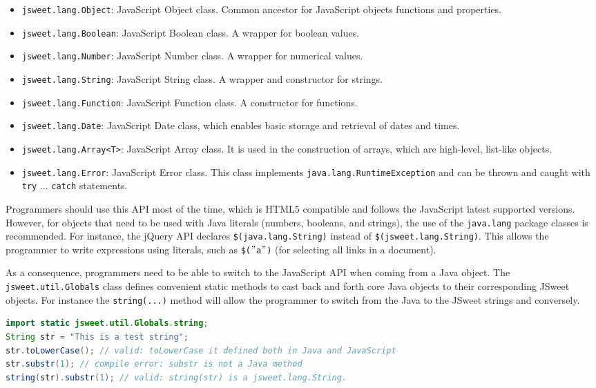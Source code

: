 \documentclass[a4paper]{report}
\begin{document}
\begin{itemize}
\item \texttt{jsweet.lang.Object}: JavaScript Object class. Common ancestor for JavaScript objects functions and properties.
\item \texttt{jsweet.lang.Boolean}: JavaScript Boolean class. A wrapper for boolean values.
\item \texttt{jsweet.lang.Number}: JavaScript Number class. A wrapper for numerical values.
\item \texttt{jsweet.lang.String}: JavaScript String class. A wrapper and constructor for strings.
\item \texttt{jsweet.lang.Function}: JavaScript Function class. A constructor for functions.
\item \texttt{jsweet.lang.Date}: JavaScript Date class, which enables basic storage and retrieval of dates and times.
\item \texttt{jsweet.lang.Array<T>}: JavaScript Array class. It is used in the construction of arrays, which are high-level, list-like objects.
\item \texttt{jsweet.lang.Error}: JavaScript Error class. This class implements \texttt{java.lang.RuntimeException} and can be thrown and caught with \texttt{try} ... \texttt{catch} statements.
\end{itemize}

Programmers should use this API most of the time, which is HTML5 compatible and follows the JavaScript latest supported versions. However, for objects that need to be used with Java literals (numbers, booleans, and strings), the use of the \texttt{java.lang} package classes is recommended. For instance, the jQuery API declares \texttt{\$(java.lang.String)} instead of \texttt{\$(jsweet.\-lang.\-String)}. This allows the programmer to write expressions using literals, such as \texttt{\$($"$a$"$)} (for selecting all links in a document).

As a consequence, programmers need to be able to switch to the JavaScript API when coming from a Java object. The \texttt{jsweet.util.Globals} class defines convenient static methods to cast back and forth core Java objects to their corresponding JSweet objects. For instance the \texttt{string(...)} method will allow the programmer to switch from the Java to the JSweet strings and conversely.

\begin{lstlisting}[language=Java]
import static jsweet.util.Globals.string;
String str = "This is a test string";
str.toLowerCase(); // valid: toLowerCase it defined both in Java and JavaScript
str.substr(1); // compile error: substr is not a Java method
string(str).substr(1); // valid: string(str) is a jsweet.lang.String.
\end{lstlisting}
\end{document}
